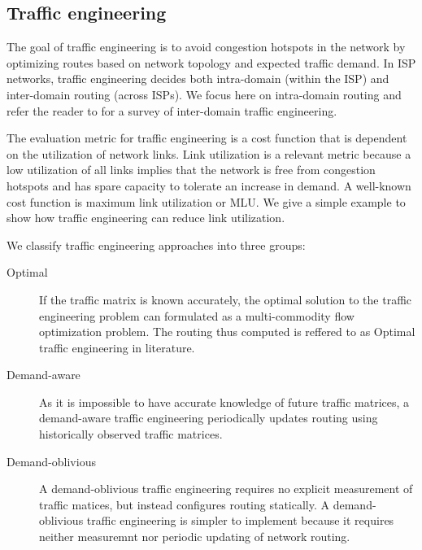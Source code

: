 \subsection{Traffic engineering}
\label{sec:ch2-te}

The goal of traffic engineering is to avoid congestion hotspots in the network by optimizing routes based on network topology and expected traffic demand. In ISP networks, traffic engineering decides both intra-domain (within the ISP) and inter-domain routing (across ISPs). We focus here on intra-domain routing and refer the reader to  \cite{Feamster2003,rexford} for a survey of inter-domain traffic engineering. 

The evaluation metric for traffic engineering is a cost function that is dependent on the utilization of network links. Link utilization is a relevant metric because a low utilization of all links implies that the network is free from congestion hotspots and has spare capacity to tolerate an increase in demand. A well-known cost function is maximum link utilization or MLU. We give a simple example to show how traffic engineering can reduce link utilization.


We classify traffic engineering approaches into three groups:
\begin{description}
	\item[Optimal] If the traffic matrix is known accurately, the optimal solution to the traffic engineering problem can formulated as a multi-commodity flow optimization problem. The routing thus computed is reffered to as Optimal traffic engineering in literature.
	\item[Demand-aware] As it is impossible to have accurate knowledge of future traffic matrices, a demand-aware  traffic engineering  periodically updates routing using historically observed traffic matrices.
	\item[Demand-oblivious] A demand-oblivious  traffic engineering  requires no explicit measurement of traffic matices, but instead configures routing statically. A demand-oblivious  traffic engineering  is simpler to implement because it requires neither measuremnt nor periodic updating of network routing. 
	
\end{description}



